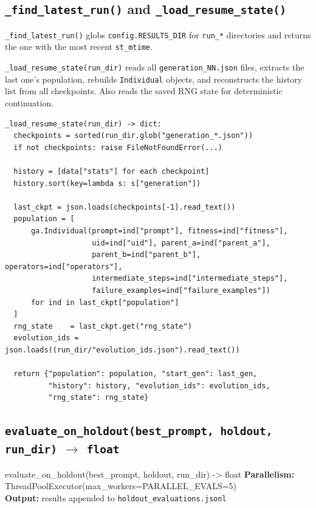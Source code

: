 \documentclass[11pt,a4paper]{report}
\newcommand{\fn}[1]{\texttt{#1}}
\begin{document}
\subsection{\fn{\_find\_latest\_run()} and \fn{\_load\_resume\_state()}}

\fn{\_find\_latest\_run()} globs \fn{config.RESULTS\_DIR} for \fn{run\_*} directories
and returns the one with the most recent \fn{st\_mtime}.

\fn{\_load\_resume\_state(run\_dir)} reads all \fn{generation\_NN.json} files, extracts
the last one's population, rebuilds \fn{Individual} objects, and reconstructs the
history list from all checkpoints.  Also reads the saved RNG state for deterministic
continuation.

\begin{lstlisting}[style=chain]
_load_resume_state(run_dir) -> dict:
  checkpoints = sorted(run_dir.glob("generation_*.json"))
  if not checkpoints: raise FileNotFoundError(...)

  history = [data["stats"] for each checkpoint]
  history.sort(key=lambda s: s["generation"])

  last_ckpt = json.loads(checkpoints[-1].read_text())
  population = [
      ga.Individual(prompt=ind["prompt"], fitness=ind["fitness"],
                    uid=ind["uid"], parent_a=ind["parent_a"],
                    parent_b=ind["parent_b"], operators=ind["operators"],
                    intermediate_steps=ind["intermediate_steps"],
                    failure_examples=ind["failure_examples"])
      for ind in last_ckpt["population"]
  ]
  rng_state    = last_ckpt.get("rng_state")
  evolution_ids = json.loads((run_dir/"evolution_ids.json").read_text())

  return {"population": population, "start_gen": last_gen,
          "history": history, "evolution_ids": evolution_ids,
          "rng_state": rng_state}
\end{lstlisting}

\subsection{\fn{evaluate\_on\_holdout(best\_prompt, holdout, run\_dir)} $\to$ \fn{float}}

\begin{specbox}{evaluate\_on\_holdout(best\_prompt, holdout, run\_dir) -> float}
\textbf{Parallelism:} ThreadPoolExecutor(max\_workers=PARALLEL\_EVALS=5)\\
\textbf{Output:} results appended to \fn{holdout\_evaluations.jsonl}
\end{specbox}
\end{document}
